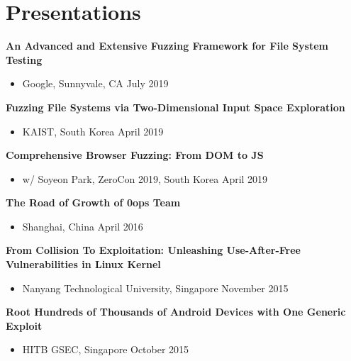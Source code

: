 \section*{Presentations}
\begin{description}

    \item \textbf{An Advanced and Extensive Fuzzing Framework for File System Testing}
        \begin{itemize}
            \item Google, Sunnyvale, CA \dotfill July 2019
        \end{itemize}

    \item \textbf{Fuzzing File Systems via Two-Dimensional Input Space Exploration}
        \begin{itemize}
            \item KAIST, South Korea \dotfill April 2019
        \end{itemize}

	\item \textbf{Comprehensive Browser Fuzzing: From DOM to JS}
      \begin{itemize}
          \item w/ Soyeon Park, ZeroCon 2019, South Korea \dotfill April 2019
      \end{itemize}

	\item \textbf{The Road of Growth of 0ops Team}
      \begin{itemize}
          \item Shanghai, China \dotfill April 2016
      \end{itemize}

	\item \textbf{From Collision To Exploitation: Unleashing Use-After-Free Vulnerabilities in Linux Kernel}
		\begin{itemize}
			\item Nanyang Technological University, Singapore \dotfill November 2015
		\end{itemize}

  \item \textbf{Root Hundreds of Thousands of Android Devices with One Generic Exploit}
    \begin{itemize}
      \item HITB GSEC, Singapore \dotfill October 2015
    \end{itemize}

\end{description}
